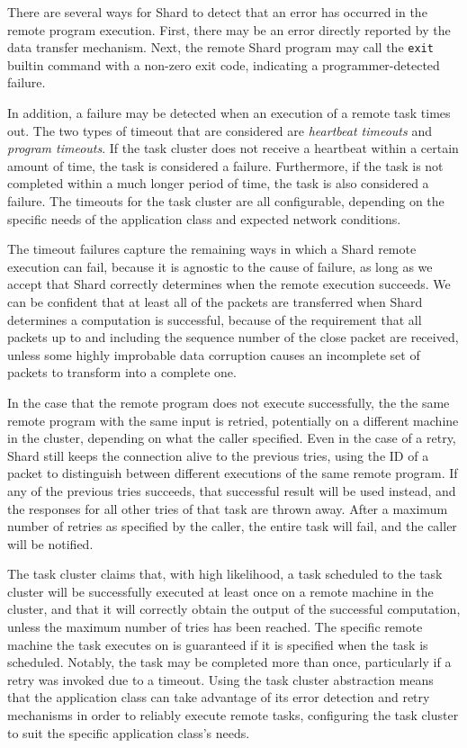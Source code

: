 \documentclass[twoside]{report}
\begin{document}
There are several ways for Shard to detect that an error has occurred in the remote program execution.
First, there may be an error directly reported by the data transfer mechanism.
Next, the remote Shard program may call the \texttt{exit} builtin command with a non-zero exit code, indicating a programmer-detected failure.

In addition, a failure may be detected when an execution of a remote task times out.
The two types of timeout that are considered are \textit{heartbeat timeouts} and \textit{program timeouts}.
If the task cluster does not receive a heartbeat within a certain amount of time, the task is considered a failure.
Furthermore, if the task is not completed within a much longer period of time, the task is also considered a failure.
The timeouts for the task cluster are all configurable, depending on the specific needs of the application class and expected network conditions.

The timeout failures capture the remaining ways in which a Shard remote execution can fail, because it is agnostic to the cause of failure, as long as we accept that Shard correctly determines when the remote execution succeeds.
We can be confident that at least all of the packets are transferred when Shard determines a computation is successful, because of the requirement that all packets up to and including the sequence number of the close packet are received, unless some highly improbable data corruption causes an incomplete set of packets to transform into a complete one.

In the case that the remote program does not execute successfully, the the same remote program with the same input is retried, potentially on a different machine in the cluster, depending on what the caller specified.
Even in the case of a retry, Shard still keeps the connection alive to the previous tries, using the ID of a packet to distinguish between different executions of the same remote program.
If any of the previous tries succeeds, that successful result will be used instead, and the responses for all other tries of that task are thrown away.
After a maximum number of retries as specified by the caller, the entire task will fail, and the caller will be notified.

The task cluster claims that, with high likelihood, a task scheduled to the task cluster will be successfully executed at least once on a remote machine in the cluster, and that it will correctly obtain the output of the successful computation, unless the maximum number of tries has been reached.
The specific remote machine the task executes on is guaranteed if it is specified when the task is scheduled.
Notably, the task may be completed more than once, particularly if a retry was invoked due to a timeout.
Using the task cluster abstraction means that the application class can take advantage of its error detection and retry mechanisms in order to reliably execute remote tasks, configuring the task cluster to suit the specific application class's needs.
\end{document}
